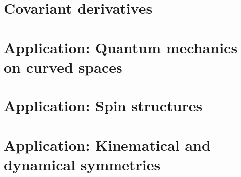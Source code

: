 \documentclass[
11pt, %
a4paper, %
oneside, %
headinclude,footinclude, %
]{scrartcl}
\begin{document}
\section{Covariant derivatives}



\section{Application: Quantum mechanics on curved spaces}



\section{Application: Spin structures}



\section{Application: Kinematical and dynamical symmetries}





%


\end{document}
